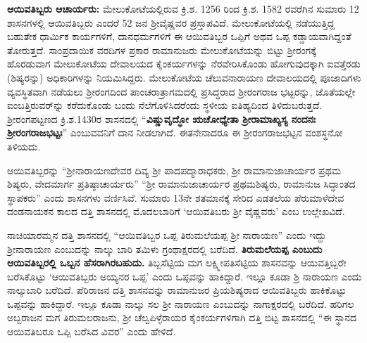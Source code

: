 \newpage

\textbf{ಆಯಿವತಿಬ್ಬರು ಆಚಾರ್ಯರು:} ಮೇಲುಕೋಟೆಯಲ್ಲಿರುವ ಕ್ರಿ.ಶ. 1256 ರಿಂದ ಕ್ರಿ.ಶ. 1582 ರವರೆಗಿನ ಸುಮಾರು 12 ಶಾಸನಗಳಲ್ಲಿ ಆಯಿವತಿಬ್ಬರು ಎಂದರೆ 52 ಜನ ಶ‍್ರೀವೈಷ್ಣವರ ಪ್ರಸ್ತಾಪವಿದೆ. ಮೇಲುಕೋಟೆಯಲ್ಲಿ ನಡೆಯುತ್ತಿದ್ದ ಬಹುತೇಕ ಧಾರ್ಮಿಕ ಕಾರ್ಯಗಳಿಗೆ, ದಾನಧರ್ಮಗಳಿಗೆ ಈ ಆಯಿವತಿಬ್ಬರ ಒಪ್ಪಿಗೆ ಅಥವ ಒಪ್ಪ ಕಡ್ಡಾಯ\-ವಾಗಿದ್ದಂತೆ ತೋರುತ್ತದೆ. ಸಾಂಪ್ರದಾಯಿಕ ವರದಿಗಳ ಪ್ರಕಾರ ರಾಮಾನುಜರು ಮೇಲುಕೋಟೆಯನ್ನು ಬಿಟ್ಟು ಶ‍್ರೀರಂಗಕ್ಕೆ ಹೊರಡುವಾಗ ಮೇಲುಕೋಟೆಯ ದೇವಾಲಯದ ಕೈಂಕರ್ಯಗಳನ್ನು ನೆರವೇರಿಸಿ\-ಕೊಂಡು ಹೋಗುವುದಕ್ಕಾಗಿ ಐವತ್ತೆರಡು (ಶಿಷ್ಯರನ್ನು) ಅಧಿಕಾರಿಗಳನ್ನು ನಿಯಮಿಸಿದ್ದರು. ಮೇಲುಕೋಟೆಯ ಚೆಲುವನಾರಾಯಣ ದೇವಾಲಯದಲ್ಲಿ ಪೂಜಾದಿಗಳು ವ್ಯವಸ್ಥಿತವಾಗಿ ನಡೆಯಲು ಶ‍್ರೀರಂಗದಿಂದ ಪಾಂಚರಾತ್ರಾಗಮದಲ್ಲಿ ಪ್ರಸಿದ್ಧರಾದ ಶ‍್ರೀರಂಗರಾಜ ಭಟ್ಟರನ್ನು, ಜೊತೆಯಲ್ಲೇ ಐಂಬತ್ತಿರುವರ್​ನ್ನು ಕರೆದುಕೊಂಡು ಬಂದು ನೆಲೆಗೊಳಿಸಿದರೆಂದು ಸ್ಥಳೀಯ ಐತಿಹ್ಯದಿಂದ ತಿಳಿದುಬರುತ್ತದೆ. ಶ‍್ರೀರಂಗಪಟ್ಟಣದ ಕ್ರಿ.ಶ.1430ರ ಶಾಸನದಲ್ಲಿ “\textbf{ವಿಷ್ಣುವೃದ್ಧೋ ಋಚೋಧ್ಯೇತಾ ಶ‍್ರೀರಾಮಾಖ್ಯಸ್ಯ ನಂದನಃ ಶ‍್ರೀರಂಗರಾಜಭಟ್ಟಃ}” ಎಂಬುವವನಿಗೆ ದಾನ ನೀಡಲಾಗಿದೆ. ಈತನೇನಾದರೂ ಈ ಶ‍್ರೀರಂಗರಾಜಭಟ್ಟನ ವಂಶಸ್ಥನೋ ತಿಳಿಯದು.

ಆಯಿವತಿಬ್ಬರನ್ನು “ಶ‍್ರೀನಾರಾಯಣದೇವರ ದಿವ್ಯ ಶ‍್ರೀ ಪಾದಪದ್ಮಾರಾಧಕರು, ಶ‍್ರೀ ರಾಮಾನುಜಾಚಾರ್ಯರ ಪ್ರಥಮ ಶಿಷ್ಯರು, ವೇದಮಾರ್ಗ ಪ್ರತಿಷ್ಠಾಚಾರ್ಯರು” “ಶ‍್ರೀ ರಾಮಾನುಜಾಚಾರ್ಯರ ಪ್ರಥಮಶಿಷ್ಯರು, ರಾಮಾನುಜ ಸಿದ್ಧಾಂತದ ಸ್ಥಾಪಕರು” ಎಂದು ಶಾಸನಗಳು ವರ್ಣಿಸಿವೆ. ಸುಮಾರು 13ನೇ ಶತಮಾನಕ್ಕೆ ಸೇರಿದ ಎಡತಲೆಯ ಪೆರುಮಾಳೆದೇವ ದಂಡನಾಯಕನ ಕಾಲದ ದತ್ತಿ ಶಾಸನದಲ್ಲಿ ಮೊದಲಬಾರಿಗೆ ‘ಆಯಿವತಿಬರು ಶ‍್ರೀ ವೈಷ್ಣವರು’ ಎಂಬ ಉಲ್ಲೇಖವಿದೆ.

ನಾಚಿಯಾರಮ್ಮನ ದತ್ತಿ ಶಾಸನದಲ್ಲಿ “ಆಯಿವತಿಬ್ಬರ ಒಪ್ಪ ತಿರುಮಲೆಯಪ್ಪ ಶ‍್ರೀ ನಾರಾಯಣ” ಎಂದು ಇದ್ದು ಶ‍್ರೀನಾರಾಯಣ ಎಂಬುದನ್ನು ನಾಲ್ಕು ಬಾರಿ ತಮಿಳು ಗ್ರಂಥಾಕ್ಷರದಲ್ಲಿ ಬರೆದಿದೆ. \textbf{ತಿರುಮಲೆಯಪ್ಪ ಎಂಬುದು ಆಯಿವತಿಬ್ಬರಲ್ಲಿ ಒಬ್ಬನ ಹೆಸರಾಗಿರಬಹುದು.} ತಿಬ್ಬಸೆಟ್ಟಿಯ ಮಗ ಲಕ್ಷ್ಮೀಪತಿಸೆಟ್ಟಿಯ ಶಾಸನವನ್ನು ಆಯಿವತ್ತಿಬ್ಬರೇ ಬರೆಸಿಕೊಟ್ಟು ‘ಆಯಿವತಿಬ್ಬರು ಅಯ್ಯನರ ಒಪ್ಪ’ ಎಂದು ಒಪ್ಪವನ್ನು ಹಾಕಿದ್ದಾರೆ. ಇಲ್ಲೂ ಕೂಡಾ ಶ್ರಿ ನಾರಾಯಣ ಎಂದು ನಾಲ್ಕುಬಾರಿ ಬರೆದಿದೆ. ಪೆರಿರಾಜನ ದತ್ತಿ ಶಾಸನವನ್ನು ರಾಮಾನುಜರ ಪ್ರಿಯಶಿಷ್ಯರಾದ ಆಯಿವತಿಬ್ಬರು ಹಾಕಿಕೊಟ್ಟು ಒಪ್ಪವನ್ನು ಹಾಕಿದ್ದಾರೆ. ಇಲ್ಲೂ ಕೂಡಾ ನಾಲ್ಕು ಸಲ ಶ‍್ರೀ ನಾರಾಯಣ ಎಂಬುದನ್ನು ನಾಗಾಕ್ಷರದಲ್ಲಿ ಬರೆದಿದೆ. ಹರಿಗಲ ಅಬ್ಬರಾಜನ ಮಗ ತಿರುಮಲರಾಜನು, ಶ‍್ರೀ ಚೆಲ್ವಪಿಳ್ಳೆರಾಯರ ಕೈಂಕರ್ಯಗಳಿಗಾಗಿ ದತ್ತಿ ಬಿಟ್ಟ ಶಾಸನದಲ್ಲಿ “ಈ ಸ್ಥಾನದ ಆಯಿವತಿಬರೂ ಒಪ್ಪಿ ಬರೆಸಿದ ವಿವರ” ಎಂದು ಹೇಳಿದೆ.

